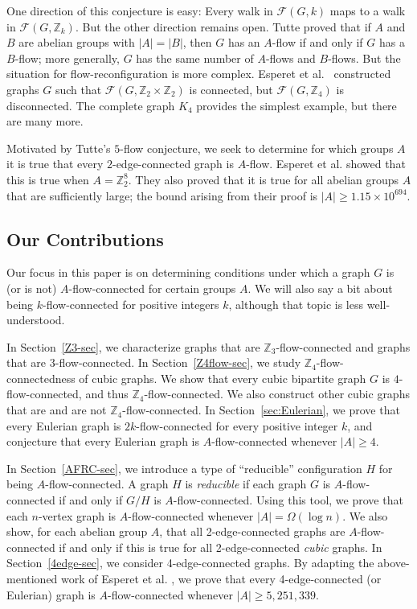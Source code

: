 \documentclass[a4paper,12pt]{article}
\theoremstyle{plain}
\theoremstyle{definition}
\newcommand{\Z}{\mathbb{Z}}
\newcommand\F{\mathcal{F}}
\renewcommand\ge\geqslant
\begin{document}
One direction of this conjecture is easy: Every walk in $\F(G,k)$ maps to a walk in $\F(G,\Z_k)$. But the other direction remains open. Tutte proved that if $A$ and $B$ are abelian groups with $|A|=|B|$, then $G$ has an $A$-flow if and only if $G$ has a $B$-flow; more generally, $G$ has the same number of $A$-flows and $B$-flows. But the situation for flow-reconfiguration is more complex. Esperet et al.~\cite{esperet-et-al} constructed graphs $G$ such that $\F(G,\Z_2\times \Z_2)$ is connected, but $\F(G,\Z_4)$ is disconnected. The complete graph $K_4$ provides the simplest example, but there are many more.

Motivated by Tutte's $5$-flow conjecture, we seek to determine for which groups $A$ it is 
true that every $2$-edge-connected graph is $A$-flow. Esperet et al. \cite{esperet-et-al} showed that this is true when $A=\Z_2^8$. They also proved that it is true for all abelian groups $A$ that are sufficiently large; the bound arising from their proof is $|A|\ge 1.15\times 10^{694}$.


\subsection*{Our Contributions}

Our focus in this paper is on
determining conditions under which a graph $G$ is (or is not) $A$-flow-connected for certain groups $A$.
We will also say a bit about being $k$-flow-connected for positive integers $k$, although that
topic is less well-understood.

In Section~\ref{Z3-sec}, we characterize graphs that are $\Z_3$-flow-connected and graphs that are $3$-flow-connected. In Section~\ref{Z4flow-sec}, we study $\Z_4$-flow-connectedness of cubic graphs. We show that every cubic bipartite graph $G$ is $4$-flow-connected, and thus $\Z_4$-flow-connected.  We also construct other cubic graphs that are and are not $\Z_4$-flow-connected. In Section~\ref{sec:Eulerian}, we prove that every Eulerian graph is $2k$-flow-connected for every positive integer $k$, and conjecture that every Eulerian graph is $A$-flow-connected whenever $|A|\ge 4$. 

In Section~\ref{AFRC-sec}, we introduce a type of ``reducible'' configuration $H$ for being $A$-flow-connected. A graph $H$ is \emph{reducible} if each graph $G$ is $A$-flow-connected if and only if $G/H$ is $A$-flow-connected. Using this tool, we prove that each $n$-vertex graph is $A$-flow-connected whenever $|A|=\Omega(\log n)$.
We also show, for each abelian group $A$, that all 2-edge-connected graphs are $A$-flow-connected if and only if this is true for all 2-edge-connected \emph{cubic} graphs.
In Section~\ref{4edge-sec}, we consider 4-edge-connected graphs.  By adapting the above-mentioned work of Esperet et al. \cite{esperet-et-al}, we prove that every 4-edge-connected (or Eulerian) graph is $A$-flow-connected whenever $|A|\ge 5,251,339$.
\end{document}

